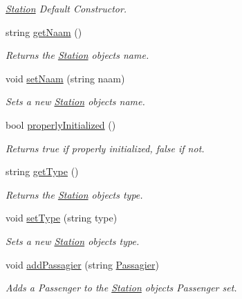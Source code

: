\begin{DoxyCompactItemize}
\begin{DoxyCompactList}\small\item\em \hyperlink{classStation}{Station} Default Constructor. \end{DoxyCompactList}\item 
string \hyperlink{classStation_a7db91849f0d5bab0a4ac0aa4967721cf}{get\+Naam} ()
\begin{DoxyCompactList}\small\item\em Returns the \hyperlink{classStation}{Station} object\textquotesingle{}s name. \end{DoxyCompactList}\item 
void \hyperlink{classStation_a9838301eaa0d45561877bcebc19a663c}{set\+Naam} (string naam)
\begin{DoxyCompactList}\small\item\em Sets a new \hyperlink{classStation}{Station} object\textquotesingle{}s name. \end{DoxyCompactList}\item 
bool \hyperlink{classStation_aab182a50a2992afe0df4412f7de4b73d}{properly\+Initialized} ()
\begin{DoxyCompactList}\small\item\em Returns true if properly initialized, false if not. \end{DoxyCompactList}\item 
string \hyperlink{classStation_aac519858a1ac53608d24d78e4b9231ab}{get\+Type} ()
\begin{DoxyCompactList}\small\item\em Returns the \hyperlink{classStation}{Station} object\textquotesingle{}s type. \end{DoxyCompactList}\item 
void \hyperlink{classStation_a1a38a1c6db22cfda3c5885281252a3b9}{set\+Type} (string type)
\begin{DoxyCompactList}\small\item\em Sets a new \hyperlink{classStation}{Station} object\textquotesingle{}s type. \end{DoxyCompactList}\item 
void \hyperlink{classStation_a9584a65058bdf75254e3a2d79ddcdba1}{add\+Passagier} (string \hyperlink{classPassagier}{Passagier})
\begin{DoxyCompactList}\small\item\em Adds a Passenger to the \hyperlink{classStation}{Station} object\textquotesingle{}s Passenger set. \end{DoxyCompactList}\item 

\end{DoxyCompactItemize}

